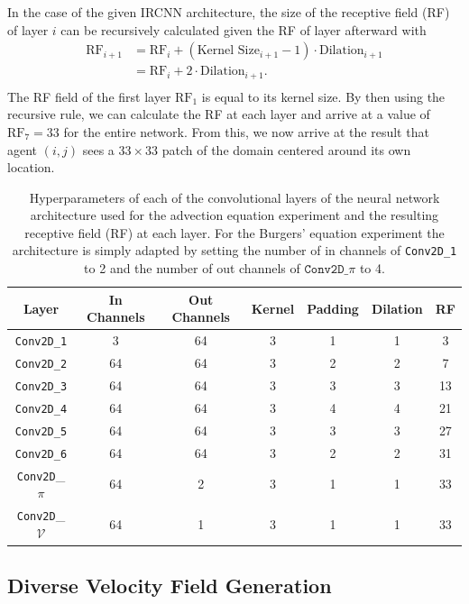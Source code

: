 In the case of the given IRCNN architecture, the size of the receptive field (RF) of layer $i$ can be recursively calculated given the RF of layer afterward with
\begin{align}
    \text{RF}_{i+1} 
    &= \text{RF}_{i} + (\text{Kernel Size}_{i+1} - 1) \cdot \text{Dilation}_{i+1}\\
    &= \text{RF}_{i} + 2 \cdot \text{Dilation}_{i+1}.\\
\end{align}
The RF field of the first layer $\text{RF}_1$ is equal to its kernel size. By then using the recursive rule, we can calculate the RF at each layer and arrive at a value of $\text{RF}_7 = 33$ for the entire network. From this, we now arrive at the result that agent $(i,j)$ sees a $33 \times 33$ patch of the domain centered around its own location.
\begin{table}[h] 
\caption{Hyperparameters of each of the convolutional layers of the neural network architecture used for the advection equation experiment and the resulting receptive field (RF) at each layer. For the Burgers' equation experiment the architecture is simply adapted by setting the number of in channels of \texttt{Conv2D\_1} to 2 and the number of out channels of $\texttt{Conv2D}\_\pi$ to 4.} 
\vskip 0.15in
\centering
\begin{tabular}{|c|c|c|c|c|c|c|}
\hline
Layer & In Channels & Out Channels & Kernel & Padding & Dilation & RF \\
\hline
\texttt{Conv2D\_1} & 3 & 64 & 3 & 1 & 1 & 3\\
\hline
\texttt{Conv2D\_2} & 64 & 64 & 3 & 2 & 2 & 7 \\
\hline
\texttt{Conv2D\_3} & 64 & 64 & 3 & 3 & 3 & 13 \\
\hline
\texttt{Conv2D\_4} & 64 & 64 & 3 & 4 & 4 & 21 \\
\hline
\texttt{Conv2D\_5} & 64 & 64 & 3 & 3 & 3 & 27 \\
\hline
\texttt{Conv2D\_6} & 64 & 64 & 3 & 2 & 2 & 31 \\
\hline
\texttt{Conv2D}\_$\pi$ & 64 & 2 & 3 & 1 & 1 & 33 \\
\hline
\texttt{Conv2D}\_$\mathcal V$ & 64 & 1 & 3 & 1 & 1 & 33 \\
\hline
\end{tabular}
\label{tab:ircnn}
\end{table}

\subsection{Diverse Velocity Field Generation}
